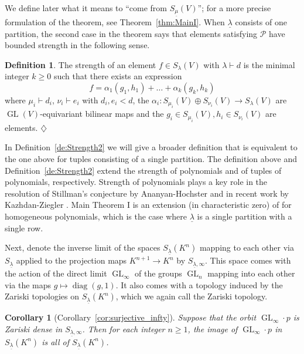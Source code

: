 \documentclass{amsart}
\theoremstyle{plain}
\newtheorem*{cor*}{Corollary}
\theoremstyle{definition}
\newtheorem*{de*}{Definition}
\DeclareMathOperator{\GL}{GL}
\DeclareMathOperator{\Diag}{diag}
\begin{document}
We define later what it means to ``come from
$S_{\underline{\mu}}(V)$''; for a more precise formulation of the theorem,
see Theorem~\ref{thm:MainI}. When $\underline{\lambda}$ consists of one
partition, the second case in the theorem says that elements
satisfying $\mathcal{P}$ have bounded strength in the
following sense. 

\begin{de*}
The strength of an element $f\in S_{\lambda}(V)$ with $\lambda \vdash d$ is the minimal integer $k\geq0$ such that there exists an expression
\[
f= \alpha_1(g_1, h_1)+\ldots+ \alpha_k(g_k, h_k)
\]
where $\mu_i \vdash d_i$, $\nu_i \vdash e_i$ with $d_i, e_i
< d$, the $\alpha_i \colon S_{\mu_i}(V)\oplus S_{\nu_i}(V)\to S_{\lambda}(V)$ are $\GL(V)$-equivariant bilinear maps and the $g_i\in S_{\mu_i}(V), h_i\in S_{\nu_i}(V)$ are elements.
\hfill$\diamondsuit$
\end{de*}

In Definition~\ref{de:Strength2} we will give a broader definition
that is equivalent to the one above for tuples consisting of
a single partition. The
definition above and Definition~\ref{de:Strength2} extend the strength
of polynomials and of tuples of polynomials, respectively. Strength of
polynomials plays a key role in the resolution of Stillman's conjecture
by Ananyan-Hochster \cite{AH:stillmanconj} and in recent work by
Kazhdan-Ziegler \cite{KZ:strength1,KZ:strength2}.  Main
Theorem I is an extension (in characteristic zero) of \cite[Theorem
1.9]{KZ:strength2} for homogeneous polynomials, which is the case
where $\underline{\lambda}$ is a single partition with a single row.

\medskip

Next, denote the inverse limit of the spaces $S_{\underline{\lambda}}(K^n)$ mapping to each other via $S_{\underline{\lambda}}$ applied to the projection maps $K^{n+1}\to K^n$ by $S_{\underline{\lambda},\infty}$. This space comes with the action of the direct limit $\GL_{\infty}$ of the groups $\GL_n$ mapping into each other via the maps $g\mapsto\Diag(g,1)$. It also comes with a topology induced by the Zariski topologies on $S_{\underline{\lambda}}(K^n)$, which we again call the Zariski topology.

\begin{cor*}[Corollary~\ref{cor:surjective_infty}]
Suppose that the orbit $\GL_\infty\!\cdot  p$ is Zariski dense in $S_{\underline{\lambda},\infty}$. Then for each integer $n\geq1$, the image of $\GL_\infty\!\cdot p$ in $S_{\underline{\lambda}}(K^n)$ is all of $S_{\underline{\lambda}}(K^n)$.
\end{cor*}
\end{document}
